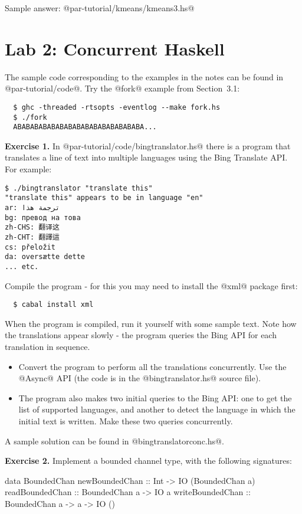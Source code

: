 \documentclass[11pt,a4paper]{article}
\newcommand{\Section}[2]{\section{#2}\label{sec:#1}}
\begin{document}
Sample answer: @par-tutorial/kmeans/kmeans3.hs@

\newpage\Section{conc}{Lab 2: Concurrent Haskell}

The sample code corresponding to the examples in the notes can be
found in @par-tutorial/code@.  Try the @fork@ example from
Section~3.1:

{\small \begin{verbatim}
  $ ghc -threaded -rtsopts -eventlog --make fork.hs
  $ ./fork
  ABABABABABABABABABABABABABABABA...
\end{verbatim}}

\textbf{Exercise 1.} In @par-tutorial/code/bingtranslator.hs@ there is
a program that translates a line of text into multiple languages using
the Bing Translate API.  For example:

{\small \begin{verbatim}
$ ./bingtranslator "translate this"
"translate this" appears to be in language "en"
ar: ترجمة هذا
bg: превод на това
zh-CHS: 翻译这
zh-CHT: 翻譯這
cs: přeložit
da: oversætte dette
... etc.
\end{verbatim}}

\noindent Compile the program - for this you may
need to install the @xml@ package first:

{\small \begin{verbatim}
  $ cabal install xml
\end{verbatim}}

When the program is compiled, run it yourself with some sample
text. Note how the translations appear slowly - the program queries
the Bing API for each translation in sequence.

\begin{itemize}
\item Convert the program to perform all the translations
  concurrently.  Use the @Async@ API (the code is in the
  @bingtranslator.hs@ source file).
\item The program also makes two initial queries to the Bing API: one
  to get the list of supported languages, and another to detect the
  language in which the initial text is written.  Make these two
  queries concurrently.
\end{itemize}

A sample solution can be found in @bingtranslatorconc.hs@.

\textbf{Exercise 2.} Implement a bounded channel type, with the
following signatures:

\begin{haskell}
data BoundedChan
newBoundedChan  :: Int -> IO (BoundedChan a)
readBoundedChan :: BoundedChan a -> IO a
writeBoundedChan :: BoundedChan a -> a -> IO ()
\end{haskell}
\end{document}
